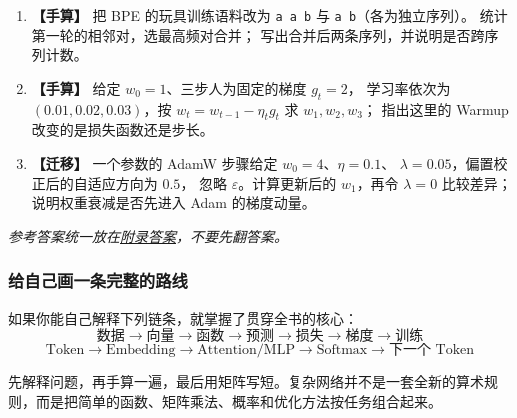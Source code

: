 \begin{enumerate}[label=\textbf{C1-\arabic*.},leftmargin=2.8em]
这与使用独立 $W_Q,W_K$ 的结果有什么不同？
\item {}\label{exercise:C1-16}   \textbf{【手算】} 把 BPE 的玩具训练语料改为
\texttt{a a b} 与 \texttt{a b}（各为独立序列）。
统计第一轮的相邻对，选最高频对合并；
写出合并后两条序列，并说明是否跨序列计数。
\item {}\label{exercise:C1-17}  \label{exercise:warmup-schedule} \textbf{【手算】}
给定 $w_0=1$、三步人为固定的梯度 $g_t=2$，
学习率依次为 $(0.01,0.02,0.03)$，按
$w_t=w_{t-1}-\eta_tg_t$ 求 $w_1,w_2,w_3$；
指出这里的 Warmup 改变的是损失函数还是步长。
\item {}\label{exercise:C1-18}  \label{exercise:adamw-decay} \textbf{【迁移】}
一个参数的 AdamW 步骤给定 $w_0=4$、$\eta=0.1$、
$\lambda=0.05$，偏置校正后的自适应方向为 $0.5$，
忽略 $\varepsilon$。计算更新后的 $w_1$，再令 $\lambda=0$
比较差异；说明权重衰减是否先进入 Adam 的梯度动量。
\end{enumerate}

\noindent\emph{参考答案统一放在\hyperref[app:answers]{附录答案}，不要先翻答案。}

\subsubsection*{给自己画一条完整的路线}
如果你能自己解释下列链条，就掌握了贯穿全书的核心：
\[
\boxed{\text{数据}\to\text{向量}\to\text{函数}\to\text{预测}\to
\text{损失}\to\text{梯度}\to\text{训练}}
\]
\[
\boxed{\text{Token}\to\text{Embedding}\to
\text{Attention/MLP}\to\text{Softmax}\to\text{下一个 Token}}
\]

\begin{conclusion}
先解释问题，再手算一遍，最后用矩阵写短。复杂网络并不是一套全新的算术规则，而是把简单的函数、矩阵乘法、概率和优化方法按任务组合起来。
\end{conclusion}
